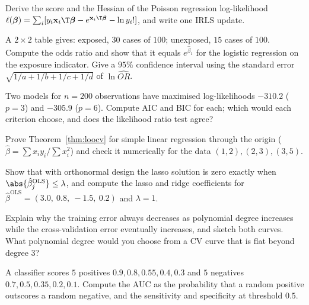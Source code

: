 \begin{exercise}
Derive the score and the Hessian of the Poisson regression log-likelihood $\ell(\boldsymbol\beta)=\sum_i[y_i\mathbf{x}_i\T\boldsymbol\beta-e^{\mathbf{x}_i\T\boldsymbol\beta}-\ln y_i!]$, and write one IRLS update.
\end{exercise}

\begin{exercise}
A $2\times2$ table gives: exposed, $30$ cases of $100$; unexposed, $15$ cases of $100$. Compute the odds ratio and show that it equals $e^{\hat\beta_1}$ for the logistic regression on the exposure indicator. Give a $95\%$ confidence interval using the standard error $\sqrt{1/a+1/b+1/c+1/d}$ of $\ln\widehat{OR}$.
\end{exercise}

\begin{exercise}
Two models for $n=200$ observations have maximised log-likelihoods $-310.2$ ($p=3$) and $-305.9$ ($p=6$). Compute AIC and BIC for each; which would each criterion choose, and does the likelihood ratio test agree?
\end{exercise}

\begin{exercise}
Prove Theorem~\ref{thm:loocv} for simple linear regression through the origin ($\hat\beta=\sum x_iy_i/\sum x_i^2$) and check it numerically for the data $(1,2),(2,3),(3,5)$.
\end{exercise}

\begin{exercise}
Show that with orthonormal design the lasso solution is zero exactly when $\abs{\hat\beta_j^{\mathrm{OLS}}}\le\lambda$, and compute the lasso and ridge coefficients for $\hat\beta^{\mathrm{OLS}}=(3.0,\ 0.8,\ -1.5,\ 0.2)$ and $\lambda=1$.
\end{exercise}

\begin{exercise}
Explain why the training error always decreases as polynomial degree increases while the cross-validation error eventually increases, and sketch both curves. What polynomial degree would you choose from a CV curve that is flat beyond degree $3$?
\end{exercise}

\begin{exercise}
A classifier scores $5$ positives $0.9,0.8,0.55,0.4,0.3$ and $5$ negatives $0.7,0.5,0.35,0.2,0.1$. Compute the AUC as the probability that a random positive outscores a random negative, and the sensitivity and specificity at threshold $0.5$.
\end{exercise}
